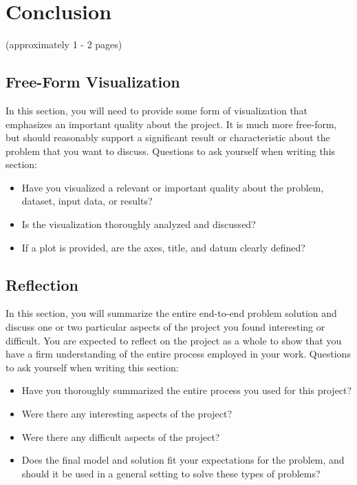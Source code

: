 \documentclass[twoside,openright,titlepage,numbers=noenddot,headinclude,%
               footinclude=true,cleardoublepage=empty,abstractoff,BCOR=5mm,%
               paper=a4,fontsize=11pt,ngerman,american]{scrreprt}
\numberwithin{theorem}{chapter}
\numberwithin{definition}{chapter}
\numberwithin{algorithm}{chapter}
\numberwithin{figure}{chapter}
\numberwithin{table}{chapter}
\numberwithin{equation}{chapter}
\begin{document}

\chapter*{Conclusion}
(approximately 1 - 2 pages)

\section*{Free-Form Visualization}
In this section, you will need to provide some form of visualization that emphasizes an important quality about the project. It is much more free-form, but should reasonably support a significant result or characteristic about the problem that you want to discuss. Questions to ask yourself when writing this section:
\begin{itemize}%
\item Have you visualized a relevant or important quality about the problem, dataset, input data, or results?
\item Is the visualization thoroughly analyzed and discussed?
\item If a plot is provided, are the axes, title, and datum clearly defined?
\end{itemize}


\section*{Reflection}
In this section, you will summarize the entire end-to-end problem solution and discuss one or two particular aspects of the project you found interesting or difficult. You are expected to reflect on the project as a whole to show that you have a firm understanding of the entire process employed in your work. Questions to ask yourself when writing this section:
\begin{itemize}%
\item Have you thoroughly summarized the entire process you used for this project?
\item Were there any interesting aspects of the project?
\item Were there any difficult aspects of the project?
\item Does the final model and solution fit your expectations for the problem, and should it be used in a general setting to solve these types of problems?
\end{itemize}
\end{document}
